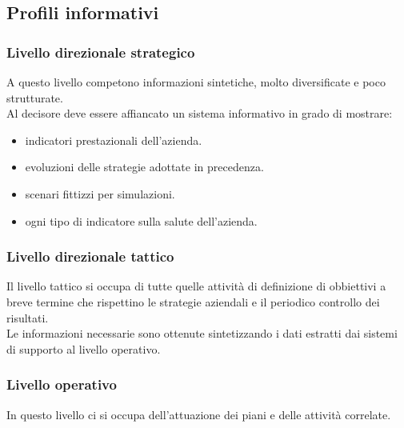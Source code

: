 \documentclass[../main.tex]{subfiles}
\begin{document}
	\subsection{Profili informativi}
	\subsubsection{Livello direzionale strategico}
	A questo livello competono informazioni sintetiche, molto diversificate e poco strutturate.\\
	Al decisore deve essere affiancato un sistema informativo in grado di mostrare:
	\begin{itemize}
		\item indicatori prestazionali dell'azienda.
		\item evoluzioni delle strategie adottate in precedenza.
		\item scenari fittizzi per simulazioni.
		\item ogni tipo di indicatore sulla salute dell'azienda.
	\end{itemize}

	\subsubsection{Livello direzionale tattico}
	Il livello tattico si occupa di tutte quelle attività di definizione di obbiettivi a breve termine che rispettino le strategie aziendali e il periodico controllo dei risultati.\\
	Le informazioni necessarie sono ottenute sintetizzando i dati estratti dai sistemi di supporto al livello operativo.

	\subsubsection{Livello operativo}
	In questo livello ci si occupa dell'attuazione dei piani e delle attività correlate.
\end{document}
